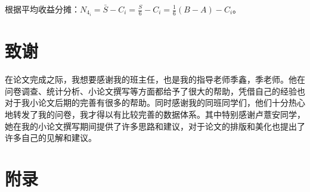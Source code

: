 \documentclass[lang=cn,a4paper]{elegantpaper}
\begin{document}
    根据平均收益分摊：$\displaystyle N_{4_i}=\bar{S}-C_i=\frac{S}{6}-C_i=\frac{1}{6}(B-A)-C_i$。

    \section*{致谢}
    在论文完成之际，我想要感谢我的班主任，也是我的指导老师季鑫，季老师。他在问卷调查、统计分析、小论文撰写等方面都给予了很大的帮助，凭借自己的经验也对于我小论文后期的完善有很多的帮助。同时感谢我的同班同学们，他们十分热心地转发了我的问卷，我才得以有比较完善的数据体系。其中特别感谢卢薏安同学，她在我的小论文撰写期间提供了许多思路和建议，对于论文的排版和美化也提出了许多自己的见解和建议。
    
    \clearpage

    
    
    \clearpage
    
    \section*{附录}
    \appendix
\end{document}
